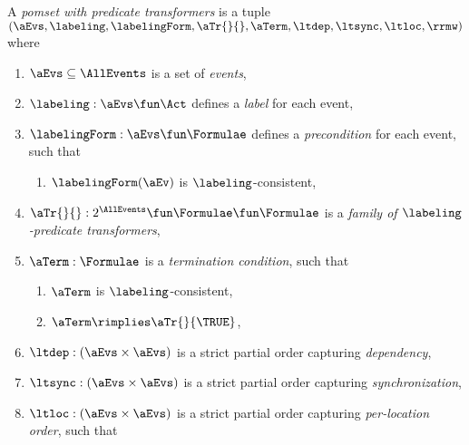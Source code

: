 \begin{definition}
  \label{def:pomset}
  A \emph{pomset with predicate transformers} 
  is a tuple $(\aEvs, \labeling, \labelingForm, \aTr{}{}, {\aTerm}, {\ltdep}, {\ltsync}, {\ltloc}, {\rrmw})$ where
  \begin{enumerate}[,label=(\textsc{m}\arabic*),ref=\textsc{m}\arabic*]
  \item \label{pom-E} 
    $\aEvs\subseteq\AllEvents$ is a set of \emph{events},
  \item \label{pom-lambda} 
    $\labeling: \aEvs \fun \Act$ defines a \emph{label} for each event,
  \item \label{pom-kappa} 
    $\labelingForm:\aEvs\fun\Formulae$ defines a \emph{precondition} for each event,
    such that
    \begin{enumerate}
    \item \label{pom-kappa-sat}
      $\labelingForm(\aEv)$ is $\labeling$-consistent,
    \end{enumerate}
  \item \label{pom-tau} 
    $\aTr{}{}:2^{\AllEvents}\fun\Formulae \fun\Formulae$ is a \emph{family of $\labeling$-predicate transformers}, 
  \item \label{pom-term} 
    $\aTerm:\Formulae$ is a \emph{termination condition}, such that 
    \begin{multicols}{2}
      \begin{enumerate}
      \item \label{pom-term-sat}
        $\aTerm$ is $\labeling$-consistent,
      \item \label{pom-term-tau}
        $\aTerm\rimplies\aTr{}{\TRUE}$,
      \end{enumerate}
    \end{multicols}
  \item \label{pom-ledep} 
    ${\ltdep} : (\aEvs\times\aEvs)$ is a strict partial order capturing \emph{dependency},
  \item \label{pom-lesync} 
    ${\ltsync} : (\aEvs\times\aEvs)$ is a strict partial order capturing \emph{synchronization}, 
  \item \label{pom-leloc} 
    ${\ltloc} : (\aEvs\times\aEvs)$ is a strict partial order capturing \emph{per-location order}, such that 

\end{enumerate}
\end{definition}
